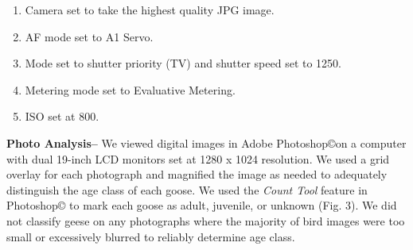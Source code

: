 \documentclass[]{article}
\begin{document}
\begin{enumerate}
\setlength{\parskip}{1ex}
   \item Camera set to take the highest quality JPG image.
   \item AF mode set to A1 Servo.
   \item Mode set to shutter priority (TV) and shutter speed set to 1250.
   \item Metering mode set to Evaluative Metering.
   \item ISO set at 800.
\end{enumerate}

\textbf{Photo Analysis--} We viewed digital images in Adobe
Photoshop\copyright\hspace{1ex}on a computer with dual 19-inch LCD
monitors set at 1280 x 1024 resolution. We used a grid overlay for each
photograph and magnified the image as needed to adequately distinguish
the age class of each goose. We used the \textit{Count Tool} feature in
Photoshop\copyright\hspace{1ex} to mark each goose as adult,
juvenile, or unknown (Fig. 3). We did not classify geese on any
photographs where the majority of bird images were too small or
excessively blurred to reliably determine age class.
\end{document}
